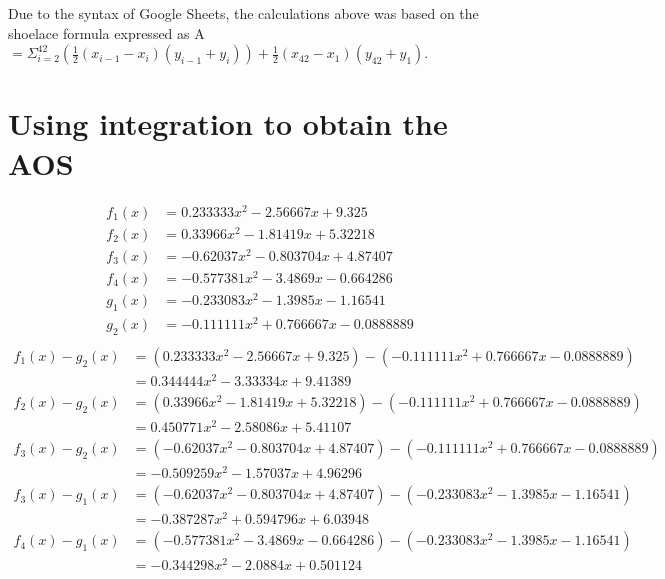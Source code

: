 \documentclass[12pt]{article}
\begin{document}
\egroup
\vspace*{-7mm}
\bgroup
\footnotesize
\singlespacing
Due to the syntax of Google Sheets, the calculations above was based on the shoelace formula expressed as A $=\Sigma^{42}_{i=2}(\frac{1}{2}(x_{i-1}-x_i)(y_{i-1}+y_i))+\frac{1}{2}(x_{42}-x_1)(y_{42}+y_1)$.
\egroup

\section{Using integration to obtain the AOS}\label{appendix:int-maths}
\bgroup
\singlespacing
\footnotesize
\allowdisplaybreaks
{}
\begin{align*}
    f_1(x)&=0.233333x^2-2.56667x+9.325\\
    f_2(x)&=0.33966x^2-1.81419x+5.32218\\
    f_3(x)&=-0.62037x^2-0.803704x+4.87407\\
    f_4(x)&=-0.577381x^2-3.4869x-0.664286\\
    g_1(x)&=-0.233083x^2-1.3985x-1.16541\\
    g_2(x)&=-0.111111x^2+0.766667x-0.0888889\\
\end{align*}
\begin{align*}
    f_1(x)-g_2(x)&=(0.233333x^2-2.56667x+9.325)-(-0.111111x^2+0.766667x-0.0888889)\\
    &=0.344444 x^2 - 3.33334 x + 9.41389\\
    f_2(x)-g_2(x)&=(0.33966x^2-1.81419x+5.32218)-(-0.111111x^2+0.766667x-0.0888889)\\
    &=0.450771 x^2 - 2.58086 x + 5.41107\\
    f_3(x)-g_2(x)&=(-0.62037x^2-0.803704x+4.87407)-(-0.111111x^2+0.766667x-0.0888889)\\
    &=-0.509259 x^2 - 1.57037 x + 4.96296\\
    f_3(x)-g_1(x)&=(-0.62037x^2-0.803704x+4.87407)-(-0.233083x^2-1.3985x-1.16541)\\
    &=-0.387287 x^2 + 0.594796 x + 6.03948\\
    f_4(x)-g_1(x)&=(-0.577381x^2-3.4869x-0.664286)-(-0.233083x^2-1.3985x-1.16541)\\
    &=-0.344298 x^2 - 2.0884 x + 0.501124\\
\end{align*}
\end{document}
